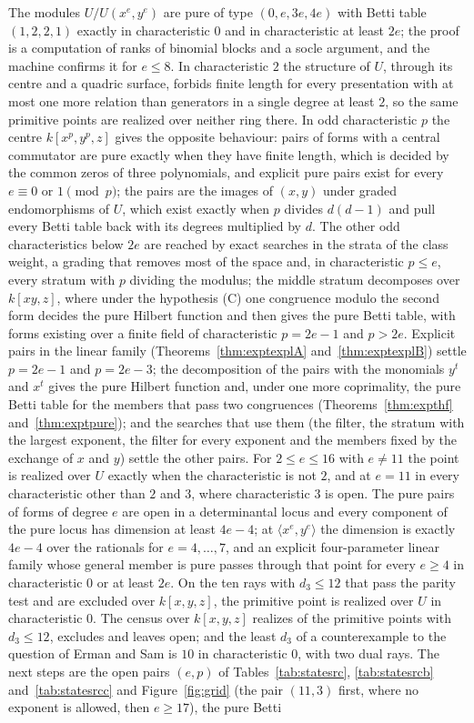 \documentclass[11pt]{article}
\theoremstyle{definition}
\theoremstyle{remark}
\begin{document}
The modules $U/U(x^e,y^e)$ are pure of type $(0,e,3e,4e)$ with Betti table $(1,2,2,1)$ exactly in characteristic $0$ and in characteristic at least $2e$; the proof is a computation of ranks of binomial blocks and a socle argument, and the machine confirms it for $e\le8$. In characteristic $2$ the structure of $U$, through its centre and a quadric surface, forbids finite length for every presentation with at most one more relation than generators in a single degree at least $2$, so the same primitive points are realized over neither ring there. In odd characteristic $p$ the centre $k[x^p,y^p,z]$ gives the opposite behaviour: pairs of forms with a central commutator are pure exactly when they have finite length, which is decided by the common zeros of three polynomials, and explicit pure pairs exist for every $e\equiv0$ or $1\pmod p$; the pairs are the images of $(x,y)$ under graded endomorphisms of $U$, which exist exactly when $p$ divides $d(d-1)$ and pull every Betti table back with its degrees multiplied by $d$. The other odd characteristics below $2e$ are reached by exact searches in the strata of the class weight, a grading that removes most of the space and, in characteristic $p\le e$, every stratum with $p$ dividing the modulus; the middle stratum decomposes over $k[xy,z]$, where under the hypothesis (C) one congruence modulo the second form decides the pure Hilbert function and then gives the pure Betti table, with forms existing over a finite field of characteristic $p=2e-1$ and $p>2e$. Explicit pairs in the linear family (Theorems~\ref{thm:exptexplA} and~\ref{thm:exptexplB}) settle $p=2e-1$ and $p=2e-3$; the decomposition of the pairs with the monomials $y^t$ and $x^t$ gives the pure Hilbert function and, under one more coprimality, the pure Betti table for the members that pass two congruences (Theorems~\ref{thm:expthf} and~\ref{thm:exptpure}); and the searches that use them (the filter, the stratum with the largest exponent, the filter for every exponent and the members fixed by the exchange of $x$ and $y$) settle the other pairs. For $2\le e\le16$ with $e\ne11$ the point is realized over $U$ exactly when the characteristic is not $2$, and at $e=11$ in every characteristic other than $2$ and $3$, where characteristic $3$ is open. The pure pairs of forms of degree $e$ are open in a determinantal locus and every component of the pure locus has dimension at least $4e-4$; at $\langle x^e,y^e\rangle$ the dimension is exactly $4e-4$ over the rationals for $e=4,\dots,7$, and an explicit four-parameter linear family whose general member is pure passes through that point for every $e\ge4$ in characteristic $0$ or at least $2e$. On the ten rays with $d_3\le12$ that pass the parity test and are excluded over $k[x,y,z]$, the primitive point is realized over $U$ in characteristic $0$. The census over $k[x,y,z]$ realizes \nrealized{} of the \nrays{} primitive points with $d_3\le12$, excludes \nexcluded{} and leaves \nopen{} open; and the least $d_3$ of a counterexample to the question of Erman and Sam is $10$ in characteristic $0$, with two dual rays. The next steps are the open pairs $(e,p)$ of Tables~\ref{tab:statesrc}, \ref{tab:statesrcb} and~\ref{tab:statesrcc} and Figure~\ref{fig:grid} (the pair $(11,3)$ first, where no exponent is allowed, then $e\ge17$), the pure Betti 
\end{document}
